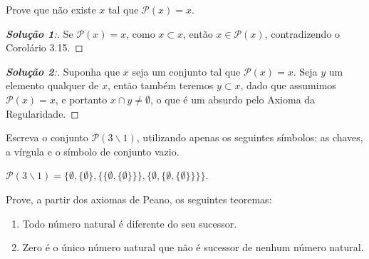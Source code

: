 \begin{exercicio}
	Prove que não existe $x$ tal que $\mathcal{P}(x)=x$.
\end{exercicio}
\begin{proof}[\textbf{Solução 1}:]
	Se $\mathcal{P}(x)=x$, como $x\subset x$, então $x\in \mathcal{P}(x)$, contradizendo o Corolário 3.15.
\end{proof}
\begin{proof}[\textbf{Solução 2}:]
	Suponha que $x$ seja um conjunto tal que $\mathcal{P}(x)=x$. Seja $y$ um elemento qualquer de $x$, então também teremos $y \subset x$, dado que assumimos $\mathcal{P}(x)=x$, e portanto $x \cap y \neq \emptyset$, o que é um absurdo pelo Axioma da Regularidade.
\end{proof}

\begin{exercicio}
	Escreva o conjunto $\mathcal{P}(3\backslash 1)$, utilizando apenas os seguintes símbolos: as chaves, a vírgula e o símbolo de conjunto vazio.
\end{exercicio}
\begin{solucao}
	$\mathcal{P}(3\backslash 1)=\{\emptyset,\{\emptyset\},\{\{\emptyset,\{\emptyset\}\}\},\{\emptyset,\{\emptyset,\{\emptyset\}\}\}\}$.
\end{solucao}

\begin{exercicio}
	Prove, a partir dos axiomas de Peano, os seguintes teoremas:
	\begin{enumerate}[label=(\alph{*})]
		\item Todo número natural é diferente do seu sucessor.
		\item Zero é o único número natural que não é sucessor de nenhum número natural.
	\end{enumerate}
\end{exercicio}

